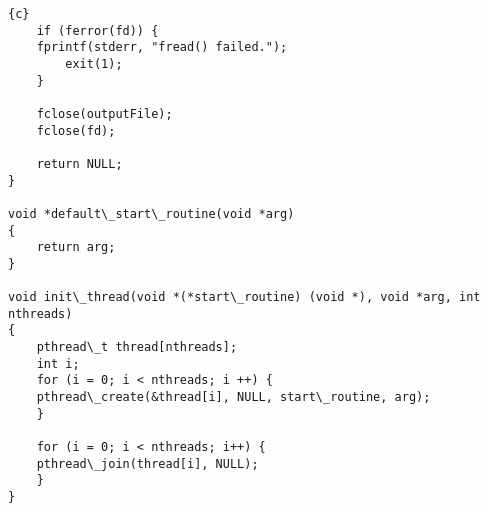 \begin{lstlisting}{c}
    if (ferror(fd)) {
	fprintf(stderr, "fread() failed.");
        exit(1);
    }

    fclose(outputFile);
    fclose(fd);
 
    return NULL;
}

void *default\_start\_routine(void *arg)
{
    return arg;
}

void init\_thread(void *(*start\_routine) (void *), void *arg, int nthreads)
{
    pthread\_t thread[nthreads];
    int i;
    for (i = 0; i < nthreads; i ++) {
	pthread\_create(&thread[i], NULL, start\_routine, arg);
    }

    for (i = 0; i < nthreads; i++) {
	pthread\_join(thread[i], NULL);
    }
}
\end{lstlisting}
